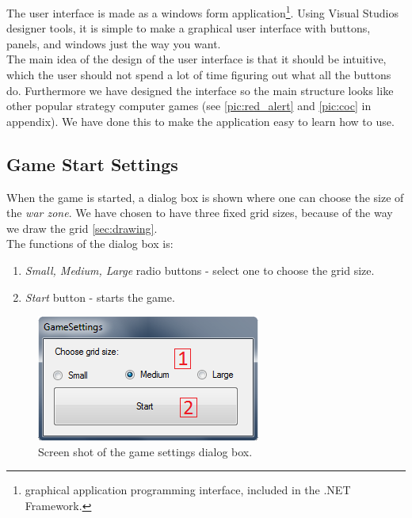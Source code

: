 The user interface is made as a windows form application\footnote{graphical application programming interface, included in the .NET Framework.}. Using Visual Studios designer tools, it is simple to make a graphical user interface with buttons, panels, and windows just the way you want.\\
   The main idea of the design of the user interface is that it should be intuitive, which  the user should not spend a lot of time figuring out what all the buttons do. Furthermore we have designed the interface so the main structure looks like other popular strategy computer games (see \ref{pic:red_alert} and \ref{pic:coc} in appendix). We have done this to make the application easy to learn how to use.
	
\subsection*{Game Start Settings}
When the game is started, a dialog box is shown where one can choose the size of the \textit{war zone}. We have chosen to have three fixed grid sizes, because of the way we draw the grid \ref{sec:drawing}.\\
   The functions of the dialog box is:
\begin{enumerate}
	\item \textit{Small, Medium, Large} radio buttons - select one to choose the grid size.
	\item \textit{Start} button - starts the game.
\end{enumerate}

\begin{figure}[H]
\begin{center}
\includegraphics[scale=0.9]{Images/dialog.png}
\end{center}
\caption{Screen shot of the game settings dialog box.}
\label{dialog}
\end{figure}

